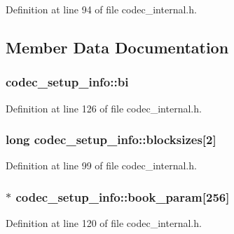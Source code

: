 Definition at line 94 of file codec\+\_\+internal.\+h.



\subsection{Member Data Documentation}
\subsubsection[{\texorpdfstring{bi}{bi}}]{ codec\+\_\+setup\+\_\+info\+::bi}\hypertarget{structcodec__setup__info_ac8f01db327dffe4b49225debaf14e253}{}\label{structcodec__setup__info_ac8f01db327dffe4b49225debaf14e253}


Definition at line 126 of file codec\+\_\+internal.\+h.

\subsubsection[{\texorpdfstring{blocksizes}{blocksizes}}]{\setlength{\rightskip}{0pt plus 5cm}long codec\+\_\+setup\+\_\+info\+::blocksizes\mbox{[}2\mbox{]}}\hypertarget{structcodec__setup__info_a8b08129139f671b7bbd9573aa2576fe9}{}\label{structcodec__setup__info_a8b08129139f671b7bbd9573aa2576fe9}


Definition at line 99 of file codec\+\_\+internal.\+h.

\subsubsection[{\texorpdfstring{book\+\_\+param}{book_param}}]{$\ast$ codec\+\_\+setup\+\_\+info\+::book\+\_\+param\mbox{[}256\mbox{]}}\hypertarget{structcodec__setup__info_abb1b7e743fc36f4b0482c7c6b944cdc2}{}\label{structcodec__setup__info_abb1b7e743fc36f4b0482c7c6b944cdc2}


Definition at line 120 of file codec\+\_\+internal.\+h.

